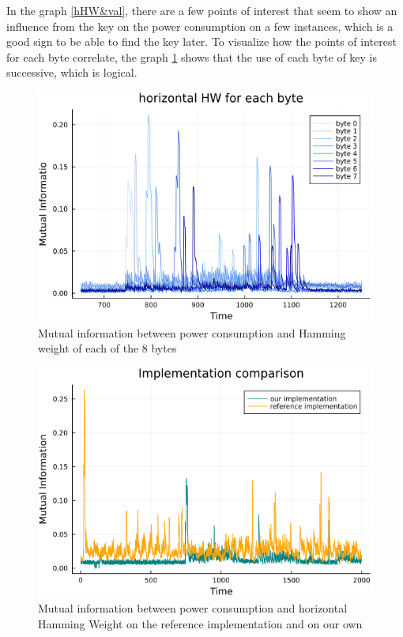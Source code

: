 \documentclass[11pt,technote]{IEEEtran}
\begin{document}
	In the graph \ref{hHW&val}, there are a few points of interest that seem to show an influence from the key on the power consumption on a few instances, which is a good sign to be able to find the key later. To visualize how the points of interest for each byte correlate, the graph \ref{hHW8_zoom} shows that the use of each byte of key is successive, which is logical. 
	
	\begin{figure}[h]
		\centering
		\includegraphics[scale=0.4]{img_files/hHW_8_bytes_zoom}
		\caption{Mutual information between power consumption and Hamming weight of each of the 8 bytes}
		\label{hHW8_zoom}
	\end{figure}
	
	\begin{figure}[h]
		\centering
		\includegraphics[scale=0.4]{img_files/comp_ref_hHW}
		\caption{Mutual information between power consumption and horizontal Hamming Weight on the reference implementation and on our own}
		\label{compref}
	\end{figure}
	
\end{document}

